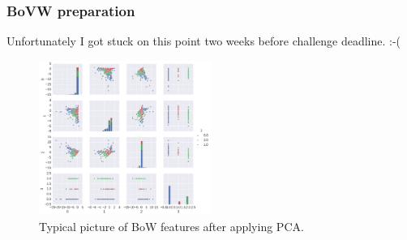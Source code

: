 \begin{frame}\frametitle{BoVW preparation}
\vspace{-0.3cm}
\par Unfortunately I got stuck on this point two weeks before challenge deadline. :-(
\begin{center}
\begin{figure}
\includegraphics[width=0.5\textwidth]{pics/bow_pca_results.png}
\caption{Typical picture of BoW features  after applying PCA.}
\end{figure}
\end{center}
\end{frame}